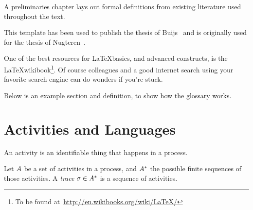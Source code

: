 A preliminaries chapter lays out formal definitions from existing literature used throughout the text.

This template has been used to publish the thesis of Buijs~\cite{MScBuijs2010} and is originally used for the thesis of Nugteren~\cite{MScNugteren2010}. 

One of the best resources for \LaTeX basics, and advanced constructs, is the \LaTeX wikibook\footnote{To be found at~\url{http://en.wikibooks.org/wiki/LaTeX/}}. Of course colleagues and a good internet search using your favorite search engine can do wonders if you're stuck. 

Below is an example section and definition, to show how the glossary works.

\section{Activities and Languages}
\label{sec:prelim:actlang}

An activity is an identifiable thing that happens in a process. 

\begin{definition}
\label{defn:activities}
Let $A$ be a set of activities in a process, and ${A}^*$ the possible finite sequences of those activities. A \emph{trace} $\sigma \in {A}^*$ is a sequence of activities. 
\end{definition}